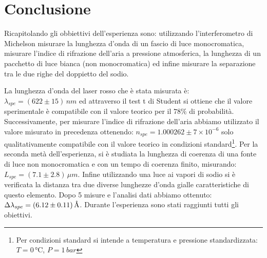 \documentclass[11pt]{article}
\begin{document}
\section{Conclusione}
Ricapitolando gli obbiettivi dell'esperienza sono: utilizzando l'interferometro di Michelson misurare la lunghezza d'onda di un fascio di luce monocromatica, misurare l'indice di rifrazione dell'aria a pressione atmosferica, la lunghezza di un pacchetto di luce bianca (non monocromatica) ed infine misurare la separazione tra le due righe del doppietto del sodio.

La lunghezza d'onda del laser rosso che è stata misurata è: $\lambda_{spe}=(622\pm15)\,nm$ ed attraverso il test t di Student si ottiene che il valore sperimentale è compatibile con il valore teorico per il $78\%$ di probabilità. Successivamente, per misurare l'indice di rifrazione dell'aria abbiamo utilizzato il valore misurato in precedenza ottenendo: $n_{spe}=1.000262\pm7\times10^{-6}$ solo qualitativamente compatibile con il valore teorico in condizioni standard\footnote{Per condizioni standard si intende a temperatura e pressione standardizzata: $T=0\,\text{°C}$, $P=1\, bar$}. Per la seconda metà dell'esperienza, si è studiata la lunghezza di coerenza di una fonte di luce non monocromatica e con un tempo di coerenza finito, misurando: $L_{spe}=(7.1\pm2.8)\,\mu m$. Infine utilizzando una luce ai vapori di sodio si è verificata la distanza tra due diverse lunghezze d'onda gialle caratteristiche di questo elemento. Dopo 5 misure e l'analisi dati abbiamo ottenuto: $\Delta\lambda_{spe}=(6.12\pm0.11)\, \text{\r{A}}$. Durante l'esperienza sono stati raggiunti tutti gli obiettivi.
\end{document}
